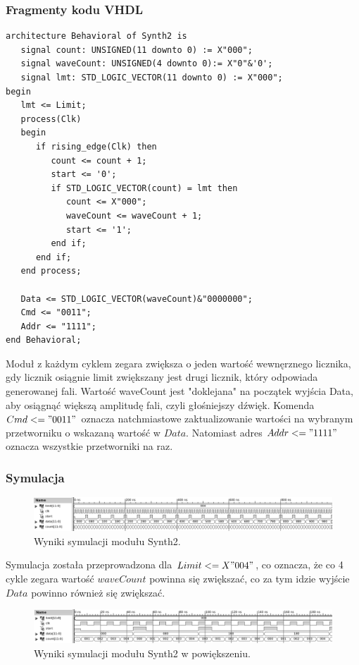 \documentclass[a4paper,11pt]{article}
\begin{document}
\subsubsection*{Fragmenty kodu VHDL}
\begin{lstlisting}[caption=Proces modułu Synth2.]
architecture Behavioral of Synth2 is
   signal count: UNSIGNED(11 downto 0) := X"000";
   signal waveCount: UNSIGNED(4 downto 0):= X"0"&'0';
   signal lmt: STD_LOGIC_VECTOR(11 downto 0) := X"000";
begin
   lmt <= Limit;
   process(Clk)
   begin
      if rising_edge(Clk) then
         count <= count + 1;
         start <= '0';
         if STD_LOGIC_VECTOR(count) = lmt then
            count <= X"000";
            waveCount <= waveCount + 1;
            start <= '1';
         end if;
      end if;
   end process;
   
   Data <= STD_LOGIC_VECTOR(waveCount)&"0000000";
   Cmd <= "0011";
   Addr <= "1111";
end Behavioral;

\end{lstlisting}
Moduł z każdym cyklem zegara zwiększa o jeden wartość wewnęrznego licznika, gdy licznik osiągnie limit zwiększany jest drugi licznik, który odpowiada generowanej fali. Wartość waveCount jest "doklejana" na początek wyjścia Data, aby osiągnąć większą amplitudę fali, czyli głośniejszy dźwięk. Komenda $Cmd <= "0011"$ oznacza natchmiastowe zaktualizowanie wartości na wybranym przetworniku o wskazaną wartość w $Data$. Natomiast adres $Addr <= "1111"$ oznacza wszystkie przetworniki na raz.

\subsubsection*{Symulacja}
\begin{figure}[H]
\center
\includegraphics[scale=0.60]{synthsym1bw.png}
\caption{Wyniki symulacji modułu Synth2.}
\end{figure}
Symulacja została przeprowadzona dla $Limit <= X"004"$, co oznacza, że co 4 cykle zegara wartość $waveCount$ powinna się zwiększać, co za tym idzie wyjście $Data$ powinno również się zwiększać.

\begin{figure}[H]
\center
\includegraphics[scale=0.60]{synthsym2bw.png}
\caption{Wyniki symulacji modułu Synth2 w powiększeniu.}
\end{figure}
\end{document}

